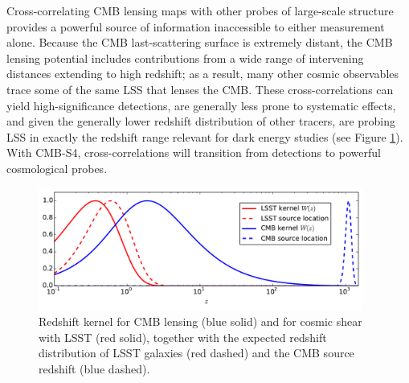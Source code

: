 Cross-correlating CMB lensing maps with other probes of large-scale structure provides a powerful source of information inaccessible to either measurement alone.
Because the CMB last-scattering surface is extremely distant, 
the CMB lensing potential includes contributions from a wide range of 
intervening distances extending to high redshift; as a result, many other cosmic observables trace some of the same LSS that lenses the CMB.
These cross-correlations can yield high-significance detections, are generally less prone to systematic effects, and given the generally lower redshift distribution of other tracers, are probing LSS in exactly the redshift
range relevant for dark energy studies (see Figure \ref{cmb-gal-kernels}). 
With CMB-S4, cross-correlations will transition from detections to powerful cosmological probes. 

\begin{figure}[htbp]
\centering
\includegraphics[width=0.95\textwidth]{CMBLensing/CMB_effs.pdf}
\caption{Redshift kernel for CMB lensing (blue solid) and for cosmic shear with LSST (red solid), together with the expected redshift distribution of LSST galaxies (red dashed) and the CMB source redshift (blue dashed).}
\label{cmb-gal-kernels}
\end{figure}

